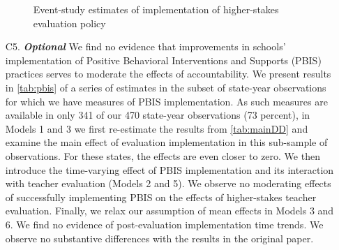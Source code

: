 \documentclass[a4paper, 11pt]{article}
\begin{document}
\begin{enumerate}
\begin{figure}
\begin{center}
\caption{Event-study estimates of implementation of higher-stakes evaluation policy}
\label{fig:event}
\end{center}
\end{figure}

	\item[C5.] \textbf{\textit{Optional }} We find no evidence that improvements in schools' implementation of Positive Behavioral Interventions and Supports (PBIS) practices serves to moderate the effects of accountability. We present results in \autoref{tab:pbis} of a series of estimates in the subset of state-year observations for which we have measures of PBIS implementation. As such measures are available in only 341 of our 470 state-year observations (73 percent), in Models 1 and 3 we first re-estimate the results from \autoref{tab:mainDD} and examine the main effect of evaluation implementation in this sub-sample of observations. For these states, the effects are even closer to zero. We then introduce the time-varying effect of PBIS implementation and its interaction with teacher evaluation (Models 2 and 5). We observe no moderating effects of successfully implementing PBIS on the effects of higher-stakes teacher evaluation. Finally, we relax our assumption of mean effects in Models 3 and 6. We find no evidence of post-evaluation implementation time trends. We observe no substantive differences with the results in the original paper.


\end{enumerate}

\begin{landscape}

\end{landscape}
\end{document}
